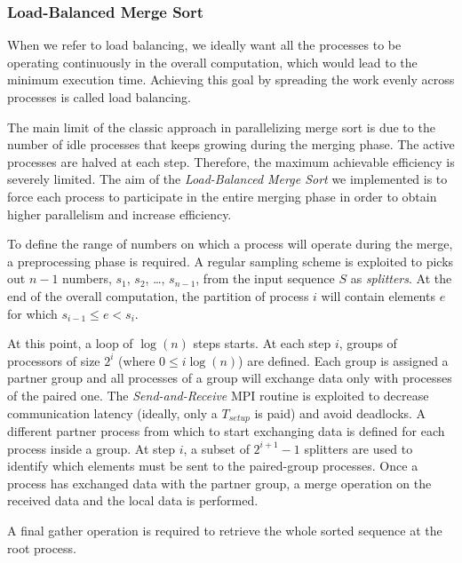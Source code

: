 \subsubsection{Load-Balanced Merge Sort}
When we refer to load balancing, we ideally want all the processes to be operating continuously in the overall computation, which would lead to the minimum execution time. Achieving this goal by spreading the work evenly across processes is called load balancing.

The main limit of the classic approach in parallelizing merge sort is due to the number of idle processes that keeps growing during the merging phase. The active processes are halved at each step. Therefore, the maximum achievable efficiency is severely limited. The aim of the \textit{Load-Balanced Merge Sort} we implemented is to force each process to participate in the entire merging phase in order to obtain higher parallelism and increase efficiency.

To define the range of numbers on which a process will operate during the merge, a preprocessing phase is required. A regular sampling scheme is exploited to picks out $n-1$ numbers, $s_1$, $s_2$, \dots, $s_{n-1}$, from the input sequence $S$ as \textit{splitters}. At the end of the overall computation, the partition of process $i$ will contain elements $e$ for which $s_{i-1} \leq e < s_i$.

At this point, a loop of $\log (n)$ steps starts. At each step $i$, groups of processors of size $2^i$ (where $0 \leq i \log(n)$) are defined. Each group is assigned a partner group and all processes of a group will exchange data only with processes of the paired one. The \textit{Send-and-Receive} MPI routine is exploited to decrease communication latency (ideally, only a $T_{setup}$ is paid) and avoid deadlocks. A different partner process from which to start exchanging data is defined for each process inside a group. At step $i$, a subset of $2^{i+1}-1$ splitters are used to identify which elements must be sent to the paired-group processes. Once a process has exchanged data with the partner group, a merge operation on the received data and the local data is performed.

A final gather operation is required to retrieve the whole sorted sequence at the root process.
